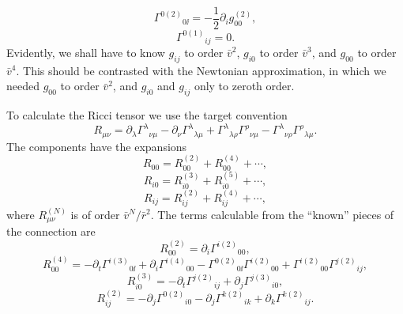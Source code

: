 \begin{equation}
  \Gamma^{0(2)}{}_{0\ii}=-\frac12\partial_i g_{00}^{(2)},
  \tag{9.1.21}\label{eq:9.1.21}
\end{equation}
\begin{equation}
  \Gamma^{0(1)}{}_{ij}=0.
  \tag{9.1.22}\label{eq:9.1.22}
\end{equation}
Evidently, we shall have to know \(g_{ij}\) to order \(\bar v^2\),
\(g_{i0}\) to order \(\bar v^3\), and \(g_{00}\) to order \(\bar v^4\).
This should be contrasted with the Newtonian approximation, in which we
needed \(g_{00}\) to order \(\bar v^2\), and \(g_{i0}\) and \(g_{ij}\) only
to zeroth order.

To calculate the Ricci tensor we use the target convention
\[
  R_{\mu\nu}
  =
  \partial_\lambda\Gamma^\lambda{}_{\nu\mu}
  -\partial_\nu\Gamma^\lambda{}_{\lambda\mu}
  +\Gamma^\lambda{}_{\lambda\rho}\Gamma^\rho{}_{\nu\mu}
  -\Gamma^\lambda{}_{\nu\rho}\Gamma^\rho{}_{\lambda\mu}.
\]
The components have the expansions
\begin{equation}
  R_{00}=R_{00}^{(2)}+R_{00}^{(4)}+\cdots,
  \tag{9.1.23}\label{eq:9.1.23}
\end{equation}
\begin{equation}
  R_{i0}=R_{i0}^{(3)}+R_{i0}^{(5)}+\cdots,
  \tag{9.1.24}\label{eq:9.1.24}
\end{equation}
\begin{equation}
  R_{ij}=R_{ij}^{(2)}+R_{ij}^{(4)}+\cdots,
  \tag{9.1.25}\label{eq:9.1.25}
\end{equation}
where \(R_{\mu\nu}^{(N)}\) is of order
\(\bar v^N/\bar r^2\). The terms calculable from the ``known'' pieces of the
connection are
\begin{equation}
  R_{00}^{(2)}=\partial_i\Gamma^{i(2)}{}_{00},
  \tag{9.1.26}\label{eq:9.1.26}
\end{equation}
\begin{equation}
  R_{00}^{(4)}
  =
  -\partial_t\Gamma^{i(3)}{}_{0\ii}
  +\partial_i\Gamma^{i(4)}{}_{00}
  -\Gamma^{0(2)}{}_{0\ii}\Gamma^{i(2)}{}_{00}
  +\Gamma^{i(2)}{}_{00}\Gamma^{j(2)}{}_{ij},
  \tag{9.1.27}\label{eq:9.1.27}
\end{equation}
\begin{equation}
  R_{i0}^{(3)}
  =
  -\partial_t\Gamma^{j(2)}{}_{ij}
  +\partial_j\Gamma^{j(3)}{}_{i0},
  \tag{9.1.28}\label{eq:9.1.28}
\end{equation}
\begin{equation}
  R_{ij}^{(2)}
  =
  -\partial_j\Gamma^{0(2)}{}_{i0}
  -\partial_j\Gamma^{k(2)}{}_{ik}
  +\partial_k\Gamma^{k(2)}{}_{ij}.
  \tag{9.1.29}\label{eq:9.1.29}
\end{equation}
